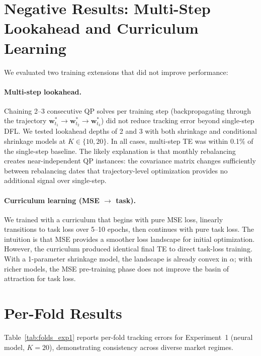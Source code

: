 \documentclass[letterpaper]{article}
\newcommand{\bw}{\mathbf{w}}
\begin{document}
\section{Negative Results: Multi-Step Lookahead and Curriculum Learning}
\label{app:negative}

We evaluated two training extensions that did not improve performance:

\paragraph{Multi-step lookahead.} Chaining 2--3 consecutive QP solves per training step (backpropagating through the trajectory $\bw^*_{t_1} \to \bw^*_{t_2} \to \bw^*_{t_3}$) did not reduce tracking error beyond single-step DFL. We tested lookahead depths of 2 and 3 with both shrinkage and conditional shrinkage models at $K \in \{10, 20\}$. In all cases, multi-step TE was within 0.1\% of the single-step baseline. The likely explanation is that monthly rebalancing creates near-independent QP instances: the covariance matrix changes sufficiently between rebalancing dates that trajectory-level optimization provides no additional signal over single-step.

\paragraph{Curriculum learning (MSE $\to$ task).} We trained with a curriculum that begins with pure MSE loss, linearly transitions to task loss over 5--10 epochs, then continues with pure task loss. The intuition is that MSE provides a smoother loss landscape for initial optimization. However, the curriculum produced identical final TE to direct task-loss training. With a 1-parameter shrinkage model, the landscape is already convex in $\alpha$; with richer models, the MSE pre-training phase does not improve the basin of attraction for task loss.

\section{Per-Fold Results}
\label{app:folds}

Table~\ref{tab:folds_exp1} reports per-fold tracking errors for Experiment~1 (neural model, $K{=}20$), demonstrating consistency across diverse market regimes.
\end{document}
